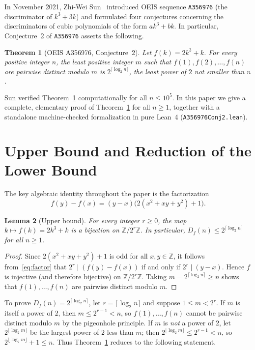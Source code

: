 \documentclass[11pt,reqno]{amsart}
\newtheorem{theorem}{Theorem}[section]
\newtheorem{lemma}[theorem]{Lemma}
\theoremstyle{remark}
\newcommand{\Z}{\mathbb{Z}}
\begin{document}
In November 2021, Zhi-Wei Sun~\cite{SunA356976} introduced OEIS sequence \texttt{A356976} (the discriminator of $k^3 + 3k$) and formulated four conjectures concerning the discriminators of cubic polynomials of the form $ak^3 + bk$. In particular, Conjecture~2 of \texttt{A356976} asserts the following.

\begin{theorem}[OEIS A356976, Conjecture~2]\label{thm:main}
Let $f(k) = 2k^3 + k$. For every positive integer $n$, the least positive integer $m$ such that $f(1), f(2), \dots, f(n)$ are pairwise distinct modulo $m$ is $2^{\lceil \log_2 n \rceil}$, the least power of $2$ not smaller than $n$.
\end{theorem}

Sun verified Theorem~\ref{thm:main} computationally for all $n \le 10^5$. In this paper we give a complete, elementary proof of Theorem~\ref{thm:main} for all $n \ge 1$, together with a standalone machine-checked formalization in pure Lean~4 (\texttt{A356976Conj2.lean}).

\section{Upper Bound and Reduction of the Lower Bound}

The key algebraic identity throughout the paper is the factorization
\begin{equation}\label{eq:factor}
f(y) - f(x) = (y - x)\bigl(2(x^2 + xy + y^2) + 1\bigr).
\end{equation}

\begin{lemma}[Upper bound]\label{lem:upper}
For every integer $r \ge 0$, the map $k \mapsto f(k) = 2k^3 + k$ is a bijection on $\Z/2^r\Z$. In particular, $D_f(n) \le 2^{\lceil \log_2 n \rceil}$ for all $n \ge 1$.
\end{lemma}

\begin{proof}
Since $2(x^2 + xy + y^2) + 1$ is odd for all $x, y \in \Z$, it follows from~\eqref{eq:factor} that $2^r \mid (f(y) - f(x))$ if and only if $2^r \mid (y - x)$. Hence $f$ is injective (and therefore bijective) on $\Z/2^r\Z$. Taking $m = 2^{\lceil \log_2 n \rceil} \ge n$ shows that $f(1), \dots, f(n)$ are pairwise distinct modulo $m$.
\end{proof}

To prove $D_f(n) = 2^{\lceil \log_2 n \rceil}$, let $r = \lceil \log_2 n \rceil$ and suppose $1 \le m < 2^r$. If $m$ is itself a power of $2$, then $m \le 2^{r-1} < n$, so $f(1), \dots, f(n)$ cannot be pairwise distinct modulo $m$ by the pigeonhole principle. If $m$ is \emph{not} a power of $2$, let $2^{\lfloor \log_2 m \rfloor}$ be the largest power of $2$ less than $m$; then $2^{\lfloor \log_2 m \rfloor} \le 2^{r-1} < n$, so $2^{\lfloor \log_2 m \rfloor} + 1 \le n$. Thus Theorem~\ref{thm:main} reduces to the following statement.
\end{document}
